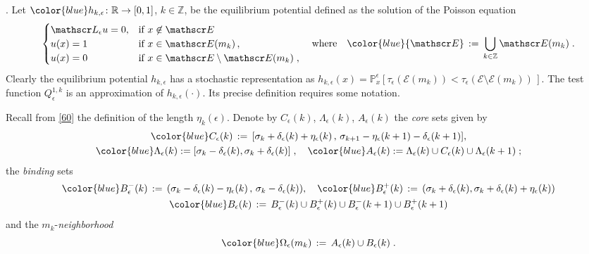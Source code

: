 \documentclass[reqno]{amsart}
\theoremstyle{plain}
\theoremstyle{definition}
\newcommand{\bb}[1]{{\mathbb #1}}
\newcommand{\ms}[1]{{\mathscr #1}}
\newcounter{as}[section]
\newcommand{\<}{\langle}
\renewcommand{\>}{\rangle}
\begin{document}
\smallskip{}.  Let
$\color{blue} h_{k,\epsilon}\colon \bb R \to [0,1]$, $k\in \bb Z$, be
the equilibrium potential defined as the solution of the Poisson
equation
\begin{equation*}
\begin{cases}
\ms L_{\epsilon}u = 0, &\text{if } x\not\in \ms E \,
\\
u(x) = 1 &\text{if } x \in \ms E(m_k)\,, 
\\
u(x) = 0 &\text{if } x \in \ms E \setminus  \ms E (m_k) \;,
\end{cases}
\quad\text{where} \quad {\color{blue} \ms E}\,:=\, \bigcup_{k\in \bb Z} \ms
E(m_k)\;. 
\end{equation*}
Clearly the equilibrium potential $h_{k,\epsilon}$ has a stochastic
representation as
$h_{k,\epsilon} (x) = \bb P^\epsilon_x [ \tau_\epsilon (\ms E(m_k)) <
\tau_\epsilon ( \ms E \setminus \ms E(m_k))\,]$.  The test function
$Q_{\epsilon}^{1,k}$ is an approximation of $h_{k,\epsilon}
(\cdot)$. Its precise definition requires some notation.

Recall from \eqref{60} the definition of the length
$\eta_k(\epsilon)$. Denote by $C_{\epsilon}(k)$,
$\Lambda_{\epsilon}(k)$, $A_{\epsilon}(k)$ the \emph{core} sets given
by 
\begin{equation}
\label{60}
\begin{gathered}
{\color{blue} C_{\epsilon}(k)} \, :=\,  [\sigma_{k} +
\delta_{\epsilon}(k) + \eta_{\epsilon}(k) \,,\, \sigma_{k+1} -
\eta_{\epsilon}(k+1) - \delta_{\epsilon}(k+1) ],
\\
{\color{blue}  \Lambda_{\epsilon}(k)} :=
[\sigma_{k} - \delta_{\epsilon}(k),
\sigma_{k}+\delta_{\epsilon}(k)]\;, 
\quad
{\color{blue}  A_{\epsilon}(k) }:= \Lambda_ {\epsilon}(k) \cup
C_{\epsilon}(k) \cup \Lambda_ {\epsilon}(k+1)\;;
\end{gathered}
\end{equation} 
the \emph{binding} sets 
\begin{equation}
\label{gluing:interv} 
\begin{gathered}
{\color{blue} B_ {\epsilon}^{-}(k)} \,:=\,  (\sigma_{k}
- \delta_{\epsilon}(k) - \eta_{\epsilon}(k)
\,,\, \sigma_{k}-\delta_{\epsilon}(k)), \quad
{\color{blue} B_{\epsilon}^{+}(k)} \,:=\,  (\sigma_{k}+\delta_{\epsilon}(k),
\sigma_{k}+ \delta_{\epsilon}(k) + \eta_{\epsilon}(k) ) 
\\
{\color{blue}  B_ {\epsilon}(k)} \, := \,  B_ {\epsilon}^{-}(k) \cup
B_ {\epsilon}^{+}(k) \cup B_ {\epsilon}^{-}(k+1) \cup B_ {\epsilon}^{+}(k+1)  
\end{gathered}
\end{equation}
and the $m_{k}$-\emph{neighborhood}
\begin{equation}
\label{well_neighb}
{\color{blue}  \Omega_{\epsilon}(m_{k})} \, := \, A_{\epsilon}(k)\cup
B_{\epsilon}(k) \;.
\end{equation} 
\end{document}

